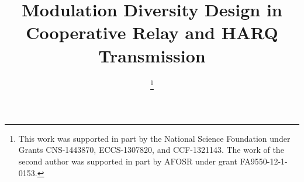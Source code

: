 \documentclass[journal,draftcls,onecolumn,12pt,twoside]{IEEEtran}
\begin{document}
%
\title{Modulation Diversity Design in Cooperative Relay and HARQ Transmission}


\author{
    \thanks{This work was supported in part by the National Science Foundation
        under Grants CNS-1443870, ECCS-1307820, and CCF-1321143. The work of the
        second author was supported in part by AFOSR under grant FA9550-12-1-0153.
    }%
}


% 
\end{document}

